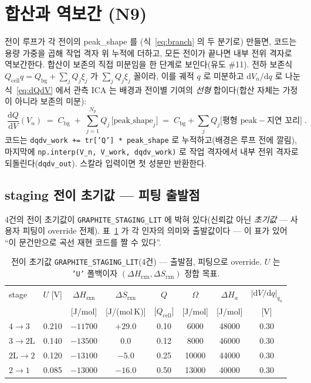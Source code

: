 \documentclass[11pt,a4paper]{article}
\newcommand{\dd}{\mathrm{d}}
\newcommand{\cell}{\mathrm{cell}}
\newcommand{\bg}{\mathrm{bg}}
\newcommand{\rxn}{\mathrm{rxn}}
\newcommand{\code}[1]{\texttt{#1}}
\begin{document}
\section{합산과 역보간 (N9)}\label{sec:sum}
전이 루프가 각 전이의 peak\_shape 를 (식~\eqref{eq:branch} 의 두 분기로) 만들면, 코드는 용량 가중을 곱해 작업 격자 위
누적에 더하고, 모든 전이가 끝나면 내부 전위 격자로 역보간한다. 합산이 보존의 직접 미분임을 한 단계로 보인다(유도 \#11).
전하 보존식 $Q_\cell q=Q_\bg+\sum_jQ_j\xi_j$ 가 $\sum_jQ_j\xi_j$ 꼴이라, 이를 궤적 $q$ 로 미분하고 $\dd V_n/\dd q$ 로
나눈 식~\eqref{eq:dQdV} 에서 관측 ICA 는 배경과 전이별 기여의 \emph{선형} 합이다(합산 자체는 가정이 아니라 보존의 미분):
\begin{equation}
\boxed{\;\frac{\dd Q}{\dd V}(V_n)\;=\;C_\bg\;+\;\sum_{j=1}^{N_p}Q_j\,
\big[\text{peak\_shape}_j\big]
\;=\;C_\bg+\sum_jQ_j\big[\text{평형 peak}-\text{지연 꼬리}\big]\;.}
\label{eq:sum}
\end{equation}
코드는 \code{dqdv\_work += tr['Q'] * peak\_shape} 로 누적하고(배경은 루프 전에 깔림), 마지막에
\code{np.interp(V\_n, V\_work, dqdv\_work)} 로 작업 격자에서 내부 전위 격자로 되돌린다(\code{dqdv\_out}).
스칼라 입력이면 첫 성분만 반환한다.

\subsection{staging 전이 초기값 — 피팅 출발점}
4건의 전이 초기값이 \code{GRAPHITE\_STAGING\_LIT} 에 박혀 있다(신뢰값 아닌 \emph{초기값} --- 사용자 피팅이 override
전제). 표~\ref{tab:staging} 가 각 인자의 의미와 출발값이다 --- 이 표가 있어 ``이 문건만으로 곡선 재현 코드를 짤 수 있다''.

\begin{table}[t]
\centering
\renewcommand{\arraystretch}{1.25}
\caption{전이 초기값 \code{GRAPHITE\_STAGING\_LIT}(4건) --- 출발점, 피팅으로 override. $U$ 는 \code{'U'}
폴백이자 $(\Delta H_\rxn,\Delta S_\rxn)$ 정합 목표.}
\label{tab:staging}
\begin{tabular}{l c c c c c c c}
\toprule
stage & $U$ [V] & $\Delta H_\rxn$ & $\Delta S_\rxn$ & $Q$ & $\Omega$ & $\Delta H_a$ & $|\dd V/\dd q|_{q_a}$ \\
 &  & [J/mol] & [J/(mol\,K)] & [$Q_\cell$] & [J/mol] & [J/mol] & [V] \\
\midrule
$4\!\to\!3$   & 0.210 & $-11700$ & $+29.0$ & 0.10 & 6000  & 48000 & 0.30 \\
$3\!\to\!2\mathrm L$ & 0.140 & $-13500$ & $0.0$   & 0.12 & 8000  & 46000 & 0.30 \\
$2\mathrm L\!\to\!2$ & 0.120 & $-13100$ & $-5.0$  & 0.25 & 10000 & 44000 & 0.30 \\
$2\!\to\!1$   & 0.085 & $-13000$ & $-16.0$ & 0.50 & 13000 & 40000 & 0.30 \\
\bottomrule
\end{tabular}
\end{table}
\end{document}
